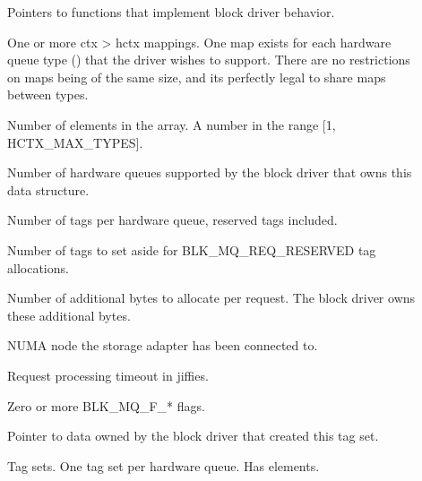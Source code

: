 \documentclass[a4paper,11pt,english]{sphinxmanual}
\begin{document}
\begin{description}
\item[{}] \leavevmode
Pointers to functions that implement block driver behavior.

\item[{}] \leavevmode
One or more ctx \sphinxhyphen{}\textgreater{} hctx mappings. One map exists for each
hardware queue type ({\hyperref[\detokenize{blk-mq:c.hctx_type}]{}}) that the driver wishes
to support. There are no restrictions on maps being of the
same size, and it\textquotesingle{}s perfectly legal to share maps between
types.

\item[{}] \leavevmode
Number of elements in the  array. A number in the range
{[}1, HCTX\_MAX\_TYPES{]}.

\item[{}] \leavevmode
Number of hardware queues supported by the block driver that
owns this data structure.

\item[{}] \leavevmode
Number of tags per hardware queue, reserved tags included.

\item[{}] \leavevmode
Number of tags to set aside for BLK\_MQ\_REQ\_RESERVED tag
allocations.

\item[{}] \leavevmode
Number of additional bytes to allocate per request. The block
driver owns these additional bytes.

\item[{}] \leavevmode
NUMA node the storage adapter has been connected to.

\item[{}] \leavevmode
Request processing timeout in jiffies.

\item[{}] \leavevmode
Zero or more BLK\_MQ\_F\_* flags.

\item[{}] \leavevmode
Pointer to data owned by the block driver that created this
tag set.

\item[{}] \leavevmode
Tag sets. One tag set per hardware queue. Has 
elements.

\end{description}
\end{document}
